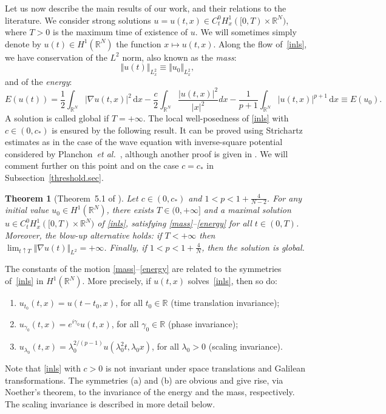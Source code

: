 \documentclass[reqno]{amsart}
\newcommand{\real}{\mathbb{R}}
\newcommand{\rn}{\real^N}
\newcommand{\intrn}{\int_{\real^N}}
\newcommand{\R}{\mathbb{R}}
\newcommand{\diff}{\,\mathrm{d}}
\newcommand{\x}{\times}
\theoremstyle{plain}
\newtheorem{theorem}{Theorem}
\theoremstyle{definition}
\numberwithin{equation}{section}
\begin{document}
Let us now describe the main results of our work, and their relations to the literature.
We consider strong solutions $u=u(t,x)\in C^0_t H^1_x ([0,T)\x\rn)$,
where $T>0$ is the maximum time of existence of $u$.
We will sometimes simply denote by $u(t)\in H^1(\rn)$ the function $x\mapsto u(t,x)$.
Along the flow of~\eqref{inls}, we have conservation of the $L^2$ norm, 
also known as the \emph{mass}:
\begin{equation}\label{mass}
\Vert u(t)\Vert_{L^2_x} \equiv \Vert u_0\Vert_{L^2_x},
\end{equation}
and of the \emph{energy}:
\begin{equation}\label{energy}
E(u(t))=\frac12 \intrn|\nabla u(t,x)|^2\diff x - \frac{c}{2}\int_{\rn}\frac{|u(t,x)|^2}{|x|^2}dx 
- \frac{1}{p+1}\intrn|u(t,x)|^{p+1}\diff x \equiv E(u_0).
\end{equation}
A solution is called global if $T=+\infty$. The local well-posedness
of \eqref{inls} with $c\in(0,c_*)$ is ensured by the following result. It can be proved
using Strichartz estimates as in the case of the wave equation with inverse-square
potential considered by Planchon~{\em et al.}~\cite{planchon}, although another proof is given in
\cite{suzuki}. We will comment further on this point and on the case $c=c_*$
in Subsection~\ref{threshold.sec}.

\begin{theorem}[Theorem~5.1 of \cite{suzuki}]\label{local.thm}
Let $c\in(0,c_*)$ and $1<p<1+\frac{4}{N-2}$.
For any initial value $u_0\in H^1(\rn)$, there exists $T\in(0,+\infty]$ and a maximal solution
$u\in C^0_t H^1_x ([0,T)\x\rn)$ of \eqref{inls},
satisfying \eqref{mass}--\eqref{energy} for all $t\in(0,T)$. Moreover, the blow-up 
alternative holds: if $T<+\infty$ then $\lim_{t\uparrow T} \Vert \nabla u(t)\Vert_{L^2}=+\infty$.
Finally, if $1<p<1+\frac{4}{N}$, then the solution is global.
\end {theorem}

The constants of the motion \eqref{mass}--\eqref{energy} are related 
to the symmetries of~\eqref{inls} in $H^1(\rn)$.
More precisely, if $u(t,x)$ solves~\eqref{inls}, then so do:
\begin{enumerate}[label=(\alph*)]
\item $u_{t_0}(t,x)=u(t-t_0,x)$, for all $t_0\in\R$ (time translation invariance);
\item $u_{\gamma_0}(t,x)=e^{i\gamma_0}u(t,x)$, for all $\gamma_0\in\R$ (phase invariance);
\item $u_{\lambda_0}(t,x)=\lambda_0^{2/(p-1)}u(\lambda_0^2t,\lambda_0x)$, 
for all $\lambda_0>0$ (scaling invariance).
\end{enumerate}
Note that \eqref{inls} with $c>0$ is not invariant under space translations and Galilean transformations.
The symmetries (a) and (b) are obvious and give rise, via Noether's theorem,
to the invariance of the energy and the mass, respectively. The scaling invariance is described 
in more detail below.
\end{document}
